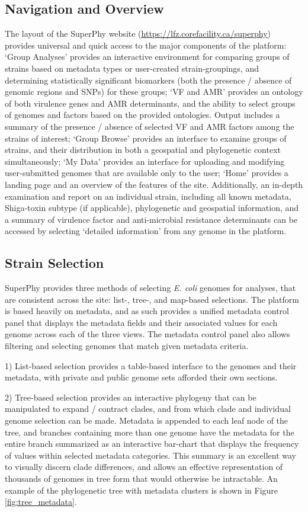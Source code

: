 \documentclass[doublespacing, linenumbers]{bmcart}
\begin{document}
\subsection{Navigation and Overview}
The layout of the SuperPhy website (\url{https://lfz.corefacility.ca/superphy}) provides universal and quick access to the major components of the platform: `Group Analyses' provides an interactive environment for comparing groups of strains based on metadata types or user-created strain-groupings, and determining statistically significant biomarkers (both the presence / absence of genomic regions and SNPs) for these groups; `VF and AMR' provides an ontology of both virulence genes and AMR determinants, and the ability to select groups of genomes and factors based on the provided ontologies. Output includes a summary of the presence / absence of selected VF and AMR factors among the strains of interest; `Group Browse' provides an interface to examine groups of strains, and their distribution in both a geospatial and phylogenetic context simultaneously; `My Data' provides an interface for uploading and modifying user-submitted genomes that are available only to the user; `Home' provides a landing page and an overview of the features of the site.  Additionally, an in-depth examination and report on an individual strain, including all known metadata, Shiga-toxin subtype (if applicable), phylogenetic and geospatial information, and a summary of virulence factor and anti-microbial resistance determinants can be accessed by selecting `detailed information' from any genome in the platform.

\subsection{Strain Selection}
SuperPhy provides three methods of selecting \textit{E. coli} genomes for analyses, that are consistent across the site: list-, tree-, and map-based selections. The platform is based heavily on metadata, and as such provides a unified metadata control panel that displays the metadata fields and their associated values for each genome across each of the three views. The metadata control panel also allows filtering and selecting genomes that match given metadata criteria.

 1) List-based selection provides a table-based interface to the genomes and their metadata, with private and public genome sets afforded their own sections.

 2) Tree-based selection provides an interactive  phylogeny that can be manipulated to expand / contract clades, and from which clade and individual genome selection can be made. Metadata is appended to each leaf node of the tree, and branches containing more than one genome have the metadata for the entire branch summarized as an interactive bar-chart that displays the frequency of values within selected metadata categories. This summary is an excellent way to visually discern clade differences, and allows an effective representation of thousands of genomes in tree form that would otherwise be intractable. An example of the phylogenetic tree with metadata clusters is shown in Figure \ref{fig:tree_metadata}.
\end{document}
